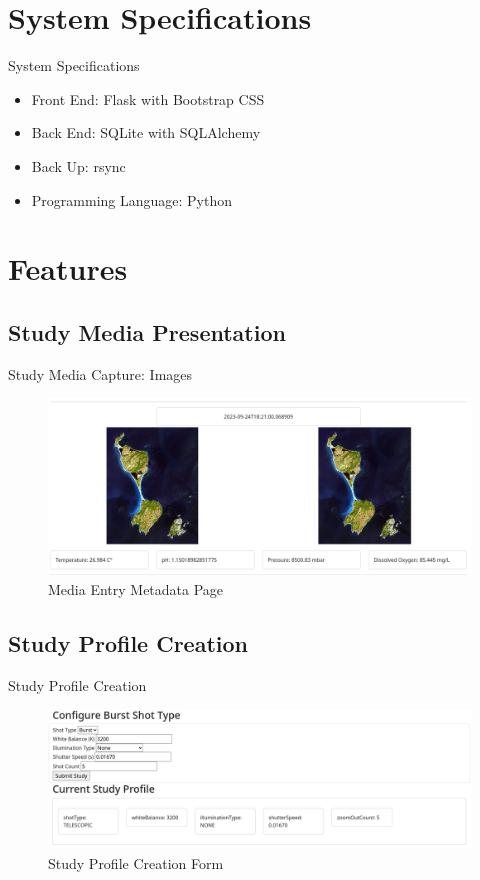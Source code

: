 \documentclass[17pt, aspectratio=169]{beamer}
\begin{document}
\section*{System Specifications}
\begin{frame}{System Specifications}
	\begin{itemize}
		\item Front End: Flask with Bootstrap CSS
		\item Back End: SQLite with SQLAlchemy
		\item Back Up: rsync
		\item Programming Language: Python
	\end{itemize}
\end{frame}
\section{Features}
\subsection*{Study Media Presentation}
\begin{frame}{Study Media Capture: Images}
	\begin{figure}
		\includegraphics[height=0.65\textheight]{./Figures/study_media_capture_images.png}
		\caption{Media Entry Metadata Page}
	\end{figure}
\end{frame}
\subsection{Study Profile Creation}
\begin{frame}{Study Profile Creation}
	\begin{figure}
		\includegraphics[height=0.60\textheight]{./Figures/study_profile_creation.png}
		\caption{Study Profile Creation Form}
	\end{figure}
\end{frame}
\end{document}
